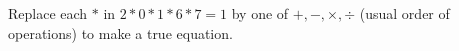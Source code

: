 Replace each $*$ in $2*0*1*6*7=1$ by one of $+,-,\times,\div$ (usual order of operations) to make a true equation.
